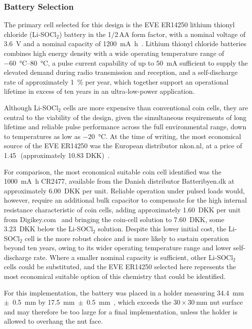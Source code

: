 \subsubsection{Battery Selection} \label{sec:battery}
The primary cell selected for this design is the EVE ER14250 lithium thionyl chloride (Li-SOCl$_2$) battery in the 1/2\,AA form factor, with a nominal voltage of \SI{3.6}{\volt} and a nominal capacity of \SI{1200}{\milli\ampere\hour}~\cite{Battery}. Lithium thionyl chloride batteries combines high energy density with a wide operating temperature range of \SIrange{-60}{+80}{\celsius}, a pulse current capability of up to \SI{50}{\milli\ampere} sufficient to supply the elevated demand during radio transmission and reception, and a self-discharge rate of approximately \SI{1}{\percent} per year, which together support an operational lifetime in excess of ten years in an ultra-low-power application.
 
Although Li-SOCl$_2$ cells are more expensive than conventional coin cells, they are central to the viability of the design, given the simultaneous requirements of long lifetime and reliable pulse performance across the full environmental range, down to temperatures as low as \SI{-20}{\celsius}. At the time of writing, the most economical source of the EVE ER14250 was the European distributor nkon.nl, at a price of 1.45\,\texteuro\ (approximately 10.83 DKK)~\cite{BatteryPrice}.
 
For comparison, the most economical suitable coin cell identified was the \SI{1000}{\milli\ampere\hour} CR2477, available from the Danish distributor Batteribyen.dk at approximately \SI{6.00}{DKK} per unit. Reliable operation under pulsed loads would, however, require an additional bulk capacitor to compensate for the high internal resistance characteristic of coin cells, adding approximately \SI{1.60}{DKK} per unit from Digikey.com~\cite{Bulk_cap} and bringing the coin-cell solution to \SI{7.60}{DKK}, some \SI{3.23}{DKK} below the Li-SOCl$_2$ solution. Despite this lower initial cost, the Li-SOCl$_2$ cell is the more robust choice and is more likely to sustain operation beyond ten years, owing to its wider operating temperature range and lower self-discharge rate. Where a smaller nominal capacity is sufficient, other Li-SOCl$_2$ cells could be substituted, and the EVE ER14250 selected here represents the most economical suitable option of this chemistry that could be identified.

For this implementation, the battery was placed in a holder measuring \SI{34.4}{\milli\meter}~$\pm$~\SI{0.5}{\milli\meter} by \SI{17.5}{\milli\meter}~$\pm$~\SI{0.5}{\milli\meter}~\cite{rs_hmi_displays}, which exceeds the $30\times\SI{30}{\milli\meter}$ nut surface and may therefore be too large for a final implementation, unless the holder is allowed to overhang the nut face.

